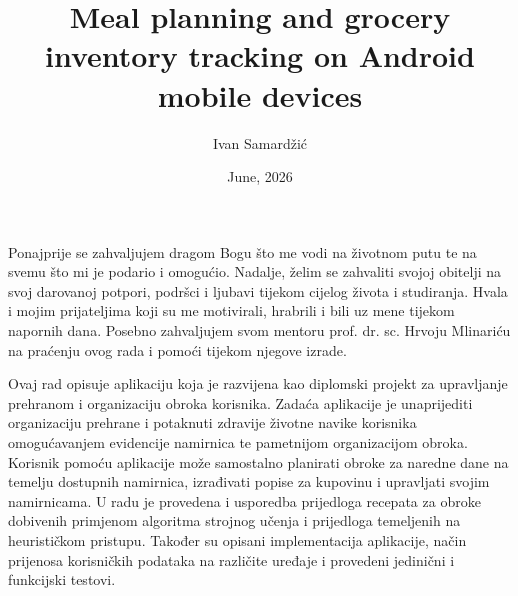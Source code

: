 \documentclass[diplomskirad]{fer}
\title{Meal planning and grocery inventory tracking on Android mobile devices}
\author{Ivan Samardžić}
\date{June, 2026}
\begin{document}
\maketitle






\begin{zahvale}
  Ponajprije se zahvaljujem dragom Bogu što me vodi na životnom putu te na svemu što mi je podario i omogućio. Nadalje, želim se zahvaliti svojoj obitelji na svoj darovanoj potpori, podršci i ljubavi tijekom cijelog života i studiranja. Hvala i mojim prijateljima koji su me motivirali, hrabrili i bili uz mene tijekom napornih dana. Posebno zahvaljujem svom mentoru prof. dr. sc. Hrvoju Mlinariću na praćenju ovog rada i pomoći tijekom njegove izrade.
\end{zahvale}


\mainmatter



\begin{sazetak}
Ovaj rad opisuje aplikaciju koja je razvijena kao diplomski projekt za upravljanje prehranom i organizaciju obroka korisnika. Zadaća aplikacije je unaprijediti organizaciju prehrane i potaknuti zdravije životne navike korisnika omogućavanjem evidencije namirnica te pametnijom organizacijom obroka. Korisnik pomoću aplikacije može samostalno planirati obroke za naredne dane na temelju dostupnih namirnica, izrađivati popise za kupovinu i upravljati svojim namirnicama. U radu je provedena i usporedba prijedloga recepata za obroke dobivenih primjenom algoritma strojnog učenja i prijedloga temeljenih na heurističkom pristupu. Također su opisani implementacija aplikacije, način prijenosa korisničkih podataka na različite uređaje i provedeni jedinični i funkcijski testovi.

\end{sazetak}
\end{document}
